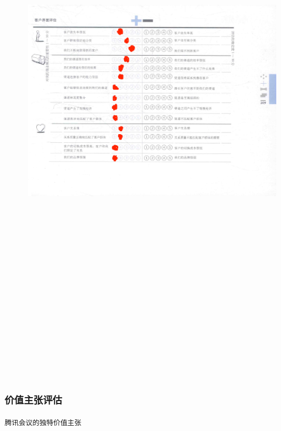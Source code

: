 \documentclass[a4paper,12pt]{article}
\begin{document}
    \begin{figure}[htbp]
        \centering
        \includegraphics[width=15cm,height=25cm]{S&W3.png}
    \end{figure}
    \clearpage %
    \subsubsection{价值主张评估}
    \texttt{腾讯会议的独特价值主张}
\end{document}
